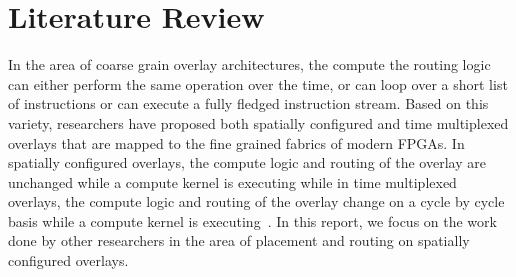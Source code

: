 \chapter{Literature Review}
\label{ch3_lit_review}
In the area of coarse grain overlay architectures, the compute the routing logic can either perform the same operation over the time, or can loop over a short list of instructions or can execute a fully fledged instruction stream.
Based on this variety, researchers have proposed both spatially configured and time multiplexed  overlays that are mapped to the fine grained fabrics of modern FPGAs.
In spatially configured overlays, the compute logic and routing of the overlay are unchanged while a compute kernel is executing while in time multiplexed overlays, the compute logic and routing of the overlay change on a cycle by cycle basis while a compute kernel is executing~\cite{liu_soft_2013,brant_coarse_2013,paul_remorph:_2012}.
In this report, we focus on the work done by other researchers in the area of placement and routing on spatially configured overlays.



